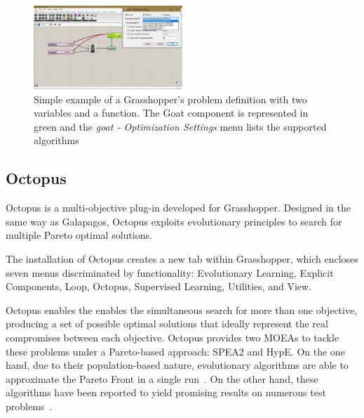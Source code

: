\begin{figure}
\centering
\includegraphics[width=0.5\textwidth]{Images/Background/Goat/general-view.png}
\caption[Goat optimization plug-in menus]{Simple example of a Grasshopper's problem definition with two variables and a function. The Goat component is represented in green and the \textit{goat - Optimization Settings} menu lists the supported algorithms}
\label{fig:goat}
\end{figure}

\subsection{Octopus}

Octopus is a multi-objective plug-in developed for Grasshopper. Designed in the same way as Galapagos, Octopus exploits evolutionary principles to search for multiple Pareto optimal solutions.  

The installation of Octopus creates a new tab within Grasshopper, which encloses seven menus discriminated by functionality: Evolutionary Learning, Explicit Components, Loop, Octopus, Supervised Learning, Utilities, and View.

Octopus enables the enables the simultaneous search for more than one objective, producing a set of possible optimal solutions that ideally represent the real compromises between each objective. Octopus provides two \acp{MOEA} to tackle these problems under a Pareto-based approach: \ac{SPEA}2 and \ac{HypE}. On the one hand, due to their population-based nature, evolutionary algorithms are able to approximate the Pareto Front in a single run~\cite{Zhou2011}. On the other hand, these algorithms have been reported to yield promising results on numerous test problems~\cite{Zitzler2001SPEA2,Zitzler2011HypE}.

